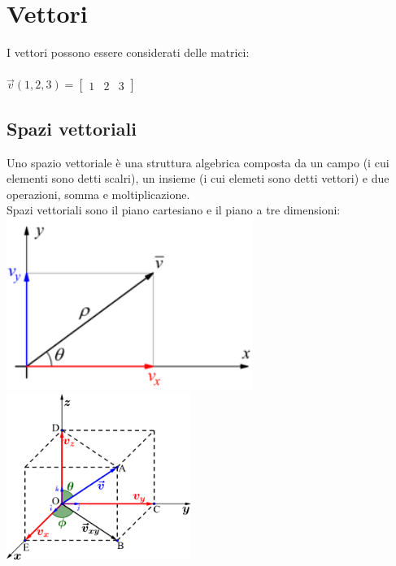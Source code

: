 \documentclass[a4paper]{article}
\begin{document}
\section{Vettori}
I vettori possono essere considerati delle matrici:
\\
\\
$\vec{v}(1,2,3) =\left[\begin{matrix} 1 & 2 & 3\end{matrix}\right]
$
\subsection{Spazi vettoriali}
Uno spazio vettoriale è una struttura algebrica composta da un campo (i cui elementi sono detti scalri), un insieme (i cui elemeti sono detti vettori) e due operazioni, somma e moltiplicazione.
\\ Spazi vettoriali sono il piano cartesiano e il piano a tre dimensioni:
\\

\includegraphics[width=8cm]{piano_cartesiano.png}
\includegraphics[width=6cm]{piano_tre_dimensioni.png}
\\
\\
\end{document}
